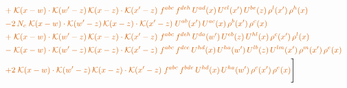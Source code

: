 \documentclass[10pt]{article}
\numberwithin{equation}{section}
\begin{document}
\begin{align}
&\quad{\color{BFK}+\;\mathcal{K}(x-w)\cdot\mathcal{K}(w'-z)\,\mathcal{K}(x-z)\cdot\mathcal{K}(x'-z)\;f^{abc}\,f^{deh}\,U^{ad}(x)\,U^{cl}(x')\,U^{be}(z)\,\rho^{l}(x')\,\rho^{h}(x)}\notag\\
&\quad{\color{BFK}-2\,N_c\;\mathcal{K}(x-w)\cdot\mathcal{K}(w'-z)\,\mathcal{K}(x-z)\cdot\mathcal{K}(x'-z)\;U^{ab}(x')\,U^{ac}(x)\,\rho^{b}(x')\,\rho^{c}(x)}\notag\\
&\quad{\color{BFK}+\;\mathcal{K}(x-w)\cdot\mathcal{K}(w'-z)\,\mathcal{K}(x-z)\cdot\mathcal{K}(x'-z)\;f^{abc}\,f^{deh}\,U^{da}(w')\,U^{eb}(z)\,U^{hl}(x)\,\rho^{c}(x')\,\rho^{l}(x)}\notag\\
&\quad{\color{BFK}-\;\mathcal{K}(x-w)\cdot\mathcal{K}(w'-z)\,\mathcal{K}(x-z)\cdot\mathcal{K}(x'-z)\;f^{abc}\,f^{dce}\,U^{hd}(x)\,U^{ha}(w')\,U^{lb}(z)\,U^{lm}(x')\,\rho^{m}(x')\,\rho^{e}(x)}\notag\\
&\quad{\color{BFK}+2\;\mathcal{K}(x-w)\cdot\mathcal{K}(w'-z)\,\mathcal{K}(x-z)\cdot\mathcal{K}(x'-z)\;f^{abc}\,f^{bde}\,U^{hd}(x)\,U^{ha}(w')\,\rho^{c}(x')\,\rho^{e}(x)}\Bigg]\label{eq:P5}
\end{align}
\end{document}
